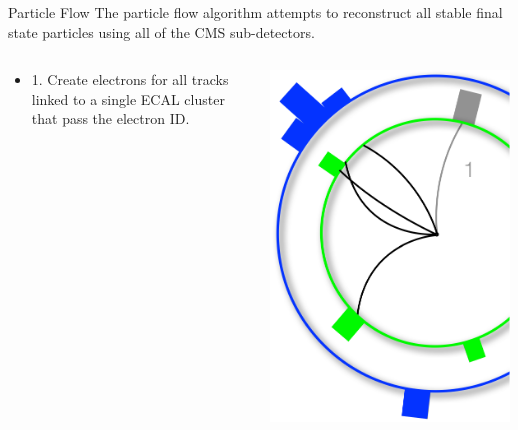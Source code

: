 \begin{frame}{Particle Flow}
The particle flow algorithm attempts to reconstruct all stable final state particles using all of the CMS sub-detectors.

\begin{columns}[T]
  \begin{column}{0.6\textwidth}
\footnotesize
    \begin{itemize}
    \item
      1. Create electrons for all tracks linked to a single ECAL cluster that pass the electron ID.
    \end{itemize}
  \end{column}
  \begin{column}{0.40\textwidth}
    \includegraphics[width=0.99\textwidth]{images/pf1.pdf}
  \end{column}
\end{columns}
\end{frame}



